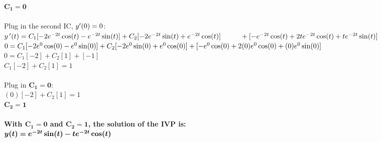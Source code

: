 \documentclass{article}
\begin{document}
\begin{enumerate}
$\bm{C_1 = 0}$\\\\
Plug in the second IC, $y\sp\prime(0)=0$:\\
$y\,\sp\prime(t) = C_1[-2e\sp{-2t}\cos(t) - e\sp{-2t}\sin(t)] + C_2[-2e\sp{-2t}\sin(t) + e\sp{-2t}\cos(t)] \\ \phantom{0.0001}+ [-e\sp{-2t}\cos(t) + 2te\sp{-2t}\cos(t) + te\sp{-2t}\sin(t)]$\\
$0 = C_1[-2e\sp{0}\cos(0) - e\sp{0}\sin(0)] + C_2[-2e\sp{0}\sin(0) + e\sp{0}\cos(0)] + [-e\sp{0}\cos(0) + 2(0)e\sp{0}\cos(0) + (0)e\sp{0}\sin(0)]$\\
$0 = C_1[-2] + C_2[1] + [-1]$\\
$C_1[-2] + C_2[1] = 1$\\\\
Plug in $\bm{C_1 = 0}$:\\
$(0)[-2] + C_2[1] = 1$\\
$\bm{C_2= 1}$\\\\
\textbf{With $\bm{C_1 = 0}$ and $\bm{C_2= 1}$, the solution of the IVP is:}\\
$\bm{y(t) = e\sp{-2t}\sin(t) -te\sp{-2t}\cos(t)}$\\



\end{enumerate}
\end{document}
